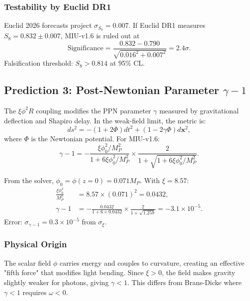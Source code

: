 \documentclass[12pt, a4paper]{article}
\theoremstyle{miuThm}
\theoremstyle{remark}
\begin{document}
\subsubsection{Testability by Euclid DR1}
Euclid 2026 forecasts \cite{Euclid2024} project $\sigma_{S_8} = 0.007$. If 
Euclid DR1 measures $S_8 = 0.832 \pm 0.007$, MIU-v1.6 is ruled out at 
\begin{equation}
\text{Significance} = \frac{0.832 - 0.790}{\sqrt{0.016^2 + 0.007^2}} = 2.4\sigma.
\label{eq:sigma_S8}
\end{equation}
Falsification threshold: $S_8 > 0.814$ at 95\% CL.

\subsection{Prediction 3: Post-Newtonian Parameter $\gamma-1$}
\label{subsec:gamma}

The $\xi\phi^2 R$ coupling modifies the PPN parameter $\gamma$ measured by 
gravitational deflection and Shapiro delay. In the weak-field limit, the 
metric is:
\begin{equation}
ds^2 = -(1+2\Phi)dt^2 + (1-2\gamma\Phi)d\mathbf{x}^2,
\label{eq:PPN_metric}
\end{equation}
where $\Phi$ is the Newtonian potential. For MIU-v1.6:
\begin{equation}
\gamma - 1 = -\frac{\xi\phi_0^2/M_P^2}{1 + 6\xi\phi_0^2/M_P^2} \times 
             \frac{2}{1 + \sqrt{1 + 6\xi\phi_0^2/M_P^2}}.
\label{eq:gamma}
\end{equation}

From the solver, $\phi_0 = \phi(z=0) = 0.071 M_P$. With $\xi = 8.57$:
\begin{align}
\frac{\xi\phi_0^2}{M_P^2} &= 8.57 \times (0.071)^2 = 0.0432, \nonumber \\
\gamma - 1 &= -\frac{0.0432}{1 + 6\times0.0432} \times \frac{2}{1 + \sqrt{1.259}} 
             = -3.1 \times 10^{-5}. \label{eq:gamma_value}
\end{align}
Error: $\sigma_{\gamma-1} = 0.3 \times 10^{-5}$ from $\sigma_\xi$.

\subsubsection{Physical Origin}
The scalar field $\phi$ carries energy and couples to curvature, creating an 
effective "fifth force" that modifies light bending. Since $\xi > 0$, the 
field makes gravity slightly weaker for photons, giving $\gamma < 1$. This 
differs from Brans-Dicke where $\gamma < 1$ requires $\omega < 0$.
\end{document}
